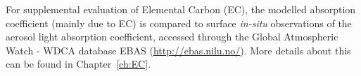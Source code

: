 For supplemental evaluation of Elemental Carbon (EC), the modelled
absorption coefficient (mainly due to EC) is compared to surface \textit{in-situ}
observations of the aerosol light absorption coefficient, accessed through
the Global Atmospheric Watch - WDCA database EBAS
(\url{http://ebas.nilu.no/}). More details about this can be found in Chapter~\ref{ch:EC}.


\renewcommand\bibname{References}      %


